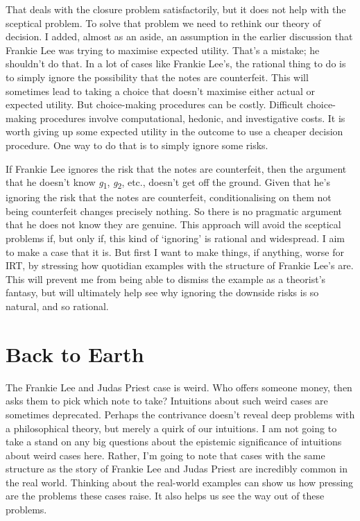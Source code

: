 \documentclass[
  10pt,
  letterpaper,
  twoside]{scrbook}
\begin{document}
That deals with the closure problem satisfactorily, but it does not help
with the sceptical problem. To solve that problem we need to rethink our
theory of decision. I added, almost as an aside, an assumption in the
earlier discussion that Frankie Lee was trying to maximise expected
utility. That's a mistake; he shouldn't do that. In a lot of cases like
Frankie Lee's, the rational thing to do is to simply ignore the
possibility that the notes are counterfeit. This will sometimes lead to
taking a choice that doesn't maximise either actual or expected utility.
But choice-making procedures can be costly. Difficult choice-making
procedures involve computational, hedonic, and investigative costs. It
is worth giving up some expected utility in the outcome to use a cheaper
decision procedure. One way to do that is to simply ignore some risks.

If Frankie Lee ignores the risk that the notes are counterfeit, then the
argument that he doesn't know \emph{g}\textsubscript{1},
\emph{g}\textsubscript{2}, etc., doesn't get off the ground. Given that
he's ignoring the risk that the notes are counterfeit, conditionalising
on them not being counterfeit changes precisely nothing. So there is no
pragmatic argument that he does not know they are genuine. This approach
will avoid the sceptical problems if, but only if, this kind of
`ignoring' is rational and widespread. I aim to make a case that it is.
But first I want to make things, if anything, worse for IRT, by
stressing how quotidian examples with the structure of Frankie Lee's
are. This will prevent me from being able to dismiss the example as a
theorist's fantasy, but will ultimately help see why ignoring the
downside risks is so natural, and so rational.

\section{Back to Earth}\label{sec-backearth}

The Frankie Lee and Judas Priest case is weird. Who offers someone
money, then asks them to pick which note to take? Intuitions about such
weird cases are sometimes deprecated. Perhaps the contrivance doesn't
reveal deep problems with a philosophical theory, but merely a quirk of
our intuitions. I am not going to take a stand on any big questions
about the epistemic significance of intuitions about weird cases here.
Rather, I'm going to note that cases with the same structure as the
story of Frankie Lee and Judas Priest are incredibly common in the real
world. Thinking about the real-world examples can show us how pressing
are the problems these cases raise. It also helps us see the way out of
these problems.
\end{document}
